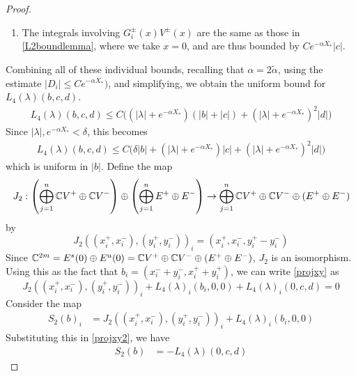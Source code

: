 \documentclass[thesis.tex]{subfiles}
\begin{document}
\begin{lemma}
\begin{proof}
\begin{enumerate}
\item The integrals involving $G_i^\pm(x) V^\pm(x)$ are the same as those in \cref{L2boundlemma}, where we take $x = 0$, and are thus bounded by $C e^{-\alpha X_*} |c|$.
\end{enumerate}

Combining all of these individual bounds, recalling that $\alpha = 2 \tilde{\alpha}$, using the estimate $|D_i| \leq C e^{-\alpha X_*})$, and simplifying, we obtain the uniform bound for $L_4(\lambda)(b, c, d)$.
\begin{align*}
L_4(\lambda)(b, c, d) \leq 
C\Big( (|\lambda| + e^{-\alpha X_*})(|b| + |c|) + (|\lambda| + e^{-\alpha X_*})^2 |d|  \Big) 
\end{align*}
Since $|\lambda|, e^{-\alpha X_*} < \delta$, this becomes
\begin{align*}
L_4(\lambda)(b, c, d) \leq 
C\Big( \delta |b| + (|\lambda| + e^{-\alpha X_*})|c| + (|\lambda| + e^{-\alpha X_*})^2 |d| \Big) 
\end{align*}
which is uniform in $|b|$. Define the map
\[
J_2: \left( \bigoplus_{j=1}^n \mathbb{C} V^+ \oplus \mathbb{C} V^- \right) \oplus
\left( \bigoplus_{j=1}^n E^+ \oplus E^- \right) 
\rightarrow \bigoplus_{j=1}^n \mathbb{C} V^+ \oplus \mathbb{C} V^- \oplus (E^+ \oplus E^-)
\]
by 
\[
J_2( (x_i^+, x_i^-),(y_i^+, y_i^-))_i = ( x_i^+, x_i^-, y_i^+ - y_i^- )
\]
Since $\mathbb{C}^{2m} = E^s(0) \oplus E^u(0) = \mathbb{C} V^+ \oplus \mathbb{C} V^- \oplus (E^+ \oplus E^-)$, $J_2$ is an isomorphism. Using this as the fact that $b_i = (x_i^- + y_i^-, x_i^+ + y_i^+)$, we can write \eqref{projxy} as
\begin{equation}\label{projxy2}
J_2( (x_i^+, x_i^-),(y_i^+, y_i^-))_i 
+ L_4(\lambda)_i(b_i, 0, 0) + L_4(\lambda)_i(0, c, d) = 0
\end{equation}
Consider the map
\begin{align*}
S_2(b)_i &= J_2( (x_i^+, x_i^-),(y_i^+, y_i^-))_i 
+ L_4(\lambda)_i(b_i, 0, 0) 
\end{align*}
Substituting this in \eqref{projxy2}, we have
\begin{align*}
S_2(b) &= -L_4(\lambda)(0, c, d)
\end{align*}


\end{proof}
\end{lemma}
\end{document}
